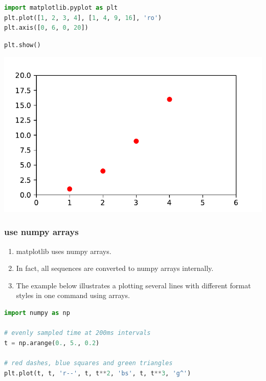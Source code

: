 \documentclass[UTF8,a4paper,12pt]{ctexart}  %
\providecommand{\tightlist}{\setlength{\itemsep}{0pt}\setlength{\parskip}{0pt}}
\begin{document}
\begin{lstlisting}[language=Python]
import matplotlib.pyplot as plt
plt.plot([1, 2, 3, 4], [1, 4, 9, 16], 'ro')
plt.axis([0, 6, 0, 20])
\end{lstlisting}

\begin{lstlisting}[language=Python]
plt.show()
\end{lstlisting}

\begin{center}\includegraphics[width=0.9\linewidth]{python-visualization_files/figure-latex/unnamed-chunk-7-1} \end{center}

\hypertarget{use-numpy-arrays}{%
\subsubsection{use numpy arrays}\label{use-numpy-arrays}}

\begin{enumerate}
\def\labelenumi{\arabic{enumi}.}
\tightlist
\item
  matplotlib uses numpy arrays.
\item
  In fact, all sequences are converted to numpy arrays internally.
\item
  The example below illustrates a plotting several lines with
  different format styles in one command using arrays.
\end{enumerate}

\begin{lstlisting}[language=Python]
import numpy as np

# evenly sampled time at 200ms intervals
t = np.arange(0., 5., 0.2)

# red dashes, blue squares and green triangles
plt.plot(t, t, 'r--', t, t**2, 'bs', t, t**3, 'g^')
\end{lstlisting}
\end{document}
